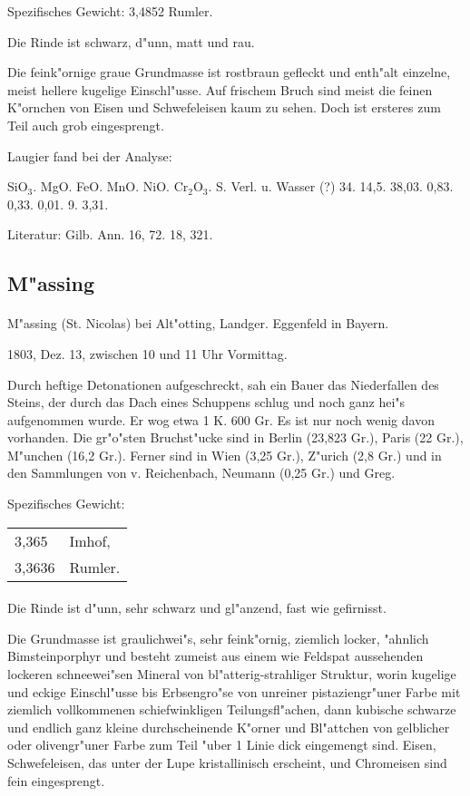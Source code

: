 \documentclass[a4paper, 11pt, oneside]{article}
\begin{document}
Spezifisches Gewicht: 3,4852 Rumler.

Die Rinde ist schwarz, d"unn, matt und rau.

Die feink"ornige graue Grundmasse ist rostbraun gefleckt und enth"alt einzelne, meist hellere kugelige Einschl"usse. Auf frischem Bruch sind meist die feinen K"ornchen von Eisen und Schwefeleisen kaum zu sehen. Doch ist ersteres zum Teil auch grob eingesprengt.

Laugier fand bei der Analyse:

SiO$_{3}$. MgO. FeO. MnO. NiO. Cr$_{2}$O$_{3}$. S. Verl. u. Wasser (?)  
34. 14,5. 38,03. 0,83. 0,33. 0,01. 9. 3,31.

Literatur: Gilb. Ann. 16, 72. 18, 321.

\subsection{M"assing}
\normalsize
\paragraph{}
M"assing (St. Nicolas) bei Alt"otting, Landger. Eggenfeld in Bayern.

1803, Dez. 13, zwischen 10 und 11 Uhr Vormittag.

Durch heftige Detonationen aufgeschreckt, sah ein Bauer das Niederfallen des Steins, der durch das Dach eines Schuppens schlug und noch ganz hei"s aufgenommen wurde. Er wog etwa 1 K. 600 Gr. Es ist nur noch wenig davon vorhanden. Die gr"o"sten Bruchst"ucke sind in Berlin (23,823 Gr.), Paris (22 Gr.), M"unchen (16,2 Gr.). Ferner sind in Wien (3,25 Gr.), Z"urich (2,8 Gr.) und in den Sammlungen von v. Reichenbach, Neumann (0,25 Gr.) und Greg.

Spezifisches Gewicht:
\begin{table}[!ht]
    \centering
    \begin{tabular}{l l}
        3,365 & Imhof,\\
        3,3636 & Rumler.
    \end{tabular}
\end{table}
\paragraph{}
Die Rinde ist d"unn, sehr schwarz und gl"anzend, fast wie gefirnisst.

Die Grundmasse ist graulichwei"s, sehr feink"ornig, ziemlich locker, "ahnlich Bimsteinporphyr und besteht zumeist aus einem wie Feldspat aussehenden lockeren schneewei"sen Mineral von bl"atterig-strahliger Struktur, worin kugelige und eckige Einschl"usse bis Erbsengro"se von unreiner pistaziengr"uner Farbe mit ziemlich vollkommenen schiefwinkligen Teilungsfl"achen, dann kubische schwarze und endlich ganz kleine durchscheinende K"orner und Bl"attchen von gelblicher oder olivengr"uner Farbe zum Teil "uber 1 Linie dick eingemengt sind. Eisen, Schwefeleisen, das unter der Lupe kristallinisch erscheint, und Chromeisen sind fein eingesprengt.
\end{document}
